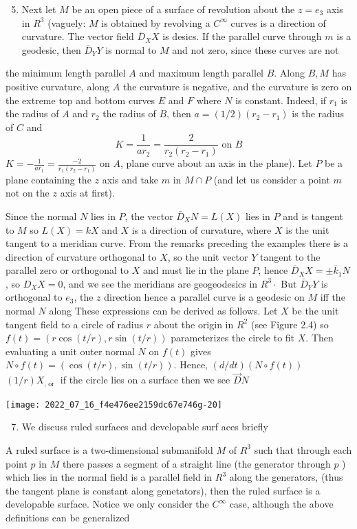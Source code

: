 \documentclass[10pt]{article}
\begin{document}
\begin{enumerate}
  \setcounter{enumi}{4}
  \item Next let $M$ be an open piece of a surface of revolution about the $z=e_{3}$ axis in $R^{3}$ (vaguely: $M$ is obtained by revolving a $C^{\infty}$ curves is a direction of curvature. The vector field $\bar{D}_{X} X$ is desics. If the parallel curve through $m$ is a geodesic, then $\bar{D}_{Y} Y$ is normal to $M$ and not zero, since these curves are not
\end{enumerate}
the minimum length parallel $A$ and maximum length parallel $B$. Along $B, M$ has positive curvature, along $A$ the curvature is negative, and the curvature is zero on the extreme top and bottom curves $E$ and $F$ where $N$ is constant. Indeed, if $r_{1}$ is the radius of $A$ and $r_{2}$ the radius of $B$, then $a=(1 / 2)\left(r_{2}-r_{1}\right)$ is the radius of $C$ and
$$
K=\frac{1}{a r_{2}}=\frac{2}{r_{2}\left(r_{2}-r_{1}\right)} \text { on } B
$$
$K=-\frac{1}{a r_{1}}=\frac{-2}{r_{1}\left(r_{2}-r_{1}\right)}$ on $A$, plane curve about an axis in the plane). Let $P$ be a plane containing the $z$ axis and take $m$ in $M \cap P$ (and let us consider a point $m$ not on the $z$ axis at first).

Since the normal $N$ lies in $P$, the vector $\bar{D}_{X} N=L(X)$ lies in $P$ and is tangent to $M$ so $L(X)=k X$ and $X$ is a direction of curvature, where $X$ is the unit tangent to a meridian curve. From the remarks preceding the examples there is a direction of curvature orthogonal to $X$, so the unit vector $Y$ tangent to the parallel zero or orthogonal to $X$ and must lie in the plane $P$, hence $\bar{D}_{X} X=\pm \bar{k}_{1} N$, so $D_{X} X=0$, and we see the meridians are geogeodesics in $R^{3} \cdot$ But $\bar{D}_{Y} Y$ is orthogonal to $e_{3}$, the $z$ direction hence a parallel curve is a geodesic on $M$ iff the normal $N$ along These expressions can be derived as follows. Let $X$ be the unit tangent field to a circle of radius $r$ about the origin in $R^{2}$ (see Figure 2.4) so $f(t)=(r \cos (t / r), r \sin (t / r))$ parameterizes the circle to fit $X$. Then evaluating a unit outer normal $N$ on $f(t)$ gives $N \circ f(t)=(\cos (t / r), \sin (t / r)) .$ Hence, $(d / d t)(N \circ f(t))$ $(1 / r) X_{\text {, or }}$ if the circle lies on a surface then we see $\vec{D} N$

\texttt{[image: 2022\_07\_16\_f4e476ee2159dc67e746g-20]}

\begin{enumerate}
  \setcounter{enumi}{6}
  \item We discuss ruled surfaces and developable surf aces briefly
\end{enumerate}
A ruled surface is a two-dimensional submanifold $M$ of $R^{3}$ such that through each point $p$ in $M$ there passes a segment of a straight line (the generator through $p$ ) which lies in the normal field is a parallel field in $R^{3}$ along the generators, (thus the tangent plane is constant along genetators), then the ruled surface is a developable surface. Notice we only consider the $C^{\infty}$ case, although the above definitions can be generalized
\end{document}
